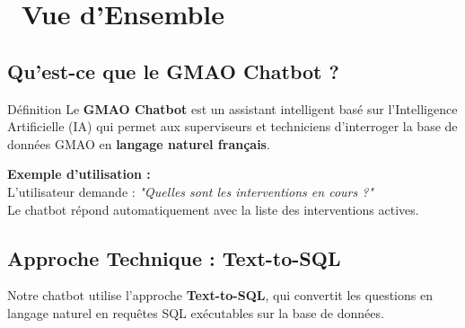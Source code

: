 \documentclass[12pt,a4paper]{article}
\begin{document}
\section{\faEye\ Vue d'Ensemble}

\subsection{Qu'est-ce que le GMAO Chatbot ?}

\begin{defbox}{Définition}
Le \textbf{GMAO Chatbot} est un assistant intelligent basé sur l'Intelligence Artificielle (IA) qui permet aux superviseurs et techniciens d'interroger la base de données GMAO en \textbf{langage naturel français}.
\end{defbox}

\begin{successbox}
\textbf{Exemple d'utilisation :}\\
L'utilisateur demande : \textit{"Quelles sont les interventions en cours ?"}\\
Le chatbot répond automatiquement avec la liste des interventions actives.
\end{successbox}

\subsection{Approche Technique : Text-to-SQL}

Notre chatbot utilise l'approche \textbf{Text-to-SQL}, qui convertit les questions en langage naturel en requêtes SQL exécutables sur la base de données.
\end{document}
